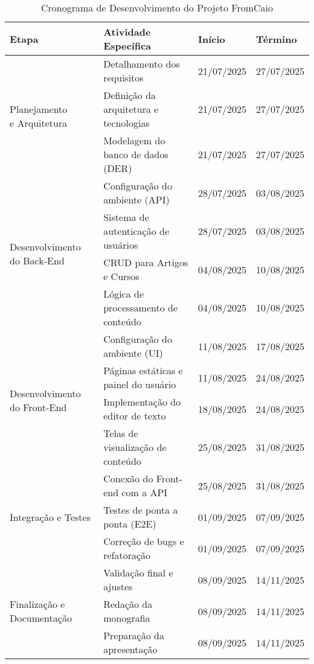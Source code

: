 \begin{table}[h!]
\centering
\caption{Cronograma de Desenvolvimento do Projeto FromCaio}
\label{tab:cronograma}
\renewcommand{\arraystretch}{1.3}
\begin{tabular}{@{}p{3.2cm} p{5.5cm} p{2.5cm} p{2.5cm}@{}}
\toprule
\textbf{Etapa} & \textbf{Atividade Específica} & \textbf{Início} & \textbf{Término} \\
\midrule

\multirow{3}{*}{\parbox[l]{3cm}{Planejamento\\e Arquitetura}}
& Detalhamento dos requisitos & 21/07/2025 & 27/07/2025 \\
& Definição da arquitetura e tecnologias & 21/07/2025 & 27/07/2025 \\
& Modelagem do banco de dados (DER) & 21/07/2025 & 27/07/2025 \\
\midrule

\multirow{4}{*}{\parbox[l]{3cm}{Desenvolvimento do Back-End}}
& Configuração do ambiente (API) & 28/07/2025 & 03/08/2025 \\
& Sistema de autenticação de usuários & 28/07/2025 & 03/08/2025 \\
& CRUD para Artigos e Cursos & 04/08/2025 & 10/08/2025 \\
& Lógica de processamento de conteúdo & 04/08/2025 & 10/08/2025 \\
\midrule

\multirow{4}{*}{\parbox[l]{3cm}{Desenvolvimento do Front-End}}
& Configuração do ambiente (UI) & 11/08/2025 & 17/08/2025 \\
& Páginas estáticas e painel do usuário & 11/08/2025 & 24/08/2025 \\
& Implementação do editor de texto & 18/08/2025 & 24/08/2025 \\
& Telas de visualização de conteúdo & 25/08/2025 & 31/08/2025 \\
\midrule

\multirow{3}{*}{\parbox[l]{3cm}{Integração e Testes}}
& Conexão do Front-end com a API & 25/08/2025 & 31/08/2025 \\
& Testes de ponta a ponta (E2E) & 01/09/2025 & 07/09/2025 \\
& Correção de bugs e refatoração & 01/09/2025 & 07/09/2025 \\
\midrule

\multirow{3}{*}{\parbox[l]{3cm}{Finalização e Documentação}}
& Validação final e ajustes & 08/09/2025 & 14/11/2025 \\
& Redação da monografia & 08/09/2025 & 14/11/2025 \\
& Preparação da apresentação & 08/09/2025 & 14/11/2025 \\
\bottomrule
\end{tabular}
\end{table}